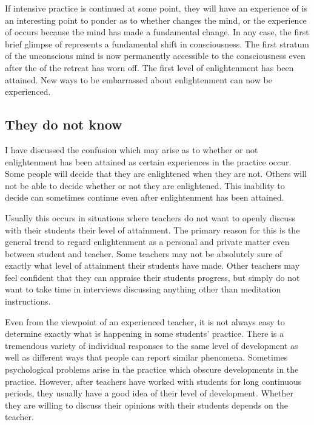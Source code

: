 \documentclass[a5paper,10pt,english]{book}
\begin{document}
\sphinxAtStartPar
If intensive practice is continued at some point, they will have an
experience of  is an interesting point to ponder as to
whether  changes the mind, or the experience of 
occurs because the mind has made a fundamental change. In any case,
the first brief glimpse of  represents a fundamental shift in
consciousness. The first stratum of the unconscious mind is now
permanently accessible to the consciousness even after the  of
the retreat has worn off. The first level of enlightenment has been
attained. New ways to be embarrassed about enlightenment can now be
experienced.


\subsection{They do not know}
\label{\detokenize{saints:they-do-not-know}}
\sphinxAtStartPar
I have discussed the confusion which may arise as to whether or not
enlightenment has been attained as certain experiences in the practice
occur. Some people will decide that they are enlightened when they are
not. Others will not be able to decide whether or not they are
enlightened. This inability to decide can sometimes continue even after
enlightenment has been attained.

\sphinxAtStartPar
Usually this occurs in situations where teachers do not want to openly
discuss with their students their level of attainment. The primary
reason for this is the general trend to regard enlightenment as a
personal and private matter even between student and teacher. Some
teachers may not be absolutely sure of exactly what level of attainment
their students have made. Other teachers may feel confident that they
can appraise their students progress, but simply do not want to take
time in interviews discussing anything other than meditation
instructions.

\sphinxAtStartPar
Even from the viewpoint of an experienced teacher, it is not always easy
to determine exactly what is happening in some students’ practice. There
is a tremendous variety of individual responses to the same level of
development as well as different ways that people can report similar
phenomena. Sometimes psychological problems arise in the practice which
obscure developments in the practice. However, after teachers have
worked with students for long continuous periods, they usually have a
good idea of their level of development. Whether they are willing to
discuss their opinions with their students depends on the teacher.
\end{document}
